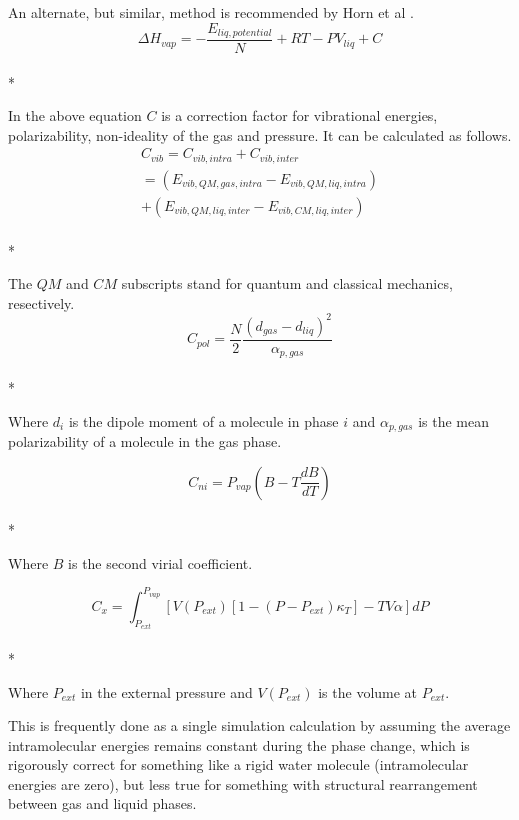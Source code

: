 \documentclass[aps,pre,twocolumn,nofootinbib,superscriptaddress,linenumbers,10pt, draft,tightenlines]{revtex4-1}
\begin{document}
An alternate, but similar, method is recommended by Horn et al \cite{horn}.
\begin{equation}\Delta H_{vap} = -\frac{E_{liq, potential}}{N} + R T - P V_{liq} + C\end{equation}\\*

In the above equation $C$ is a correction factor for vibrational energies, polarizability, non-ideality of the gas and pressure. It can be calculated as follows.
\begin{multline}
C_{vib} = C_{vib,intra} + C_{vib,inter} \\ = \left(E_{vib,QM,gas,intra} - E_{vib,QM,liq,intra}\right) \\ + \left(E_{vib,QM,liq,inter} - E_{vib,CM,liq,inter}\right)
\end{multline}\\*

The $QM$ and $CM$ subscripts stand for quantum and classical mechanics, resectively. 
\begin{equation}C_{pol} = \frac{N}{2} \frac{\left(d_{gas} - d_{liq}\right)^2}{\alpha_{p,gas}}\end{equation}\\*

Where $d_i$ is the dipole moment of a molecule in phase $i$ and $\alpha_{p,gas}$ is the mean polarizability of a molecule in the gas phase.

\begin{equation}C_{ni} = P_{vap} \left(B - T \frac{dB}{dT}\right)\end{equation}\\*

Where $B$ is the second virial coefficient.

\begin{equation}C_x = \int_{P_{ext}}^{P_{vap}} \left[V\left(P_{ext}\right)\left[1 - \left(P - P_{ext}\right) \kappa_T\right] - T V \alpha\right] dP\end{equation}\\*

Where $P_{ext}$ in the external pressure and $V\left(P_{ext}\right)$ is the volume at $P_{ext}$. 

This is frequently done as a single simulation calculation by assuming
the average intramolecular energies remains constant during the phase
change, which is rigorously correct for something like a rigid water
molecule (intramolecular energies are zero), but less true for
something with structural rearrangement between gas and liquid phases. 
\end{document}
